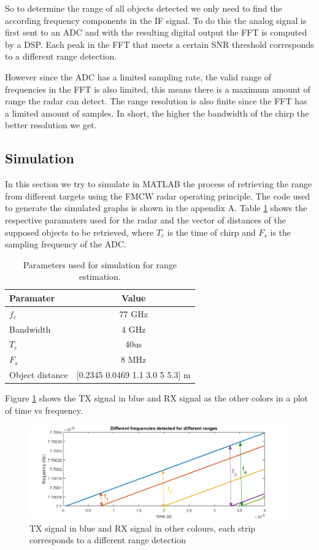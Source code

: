  So to determine the range of all objects detected we only need to find the according frequency components in the \ac{IF} signal. To do this the analog signal is first sent to an \ac{ADC} and with the resulting digital output the \ac{FFT} is computed by a \ac{DSP}. Each peak in the \ac{FFT} that meets a certain \ac{SNR} threshold corresponds to a different range detection. 
 
 However since the \ac{ADC} has a limited sampling rate, the valid range of frequencies in the \ac{FFT} is also limited, this means there is a maximum amount of range the radar can detect.
The range resolution is also finite since the \ac{FFT} has a limited amount of samples. In short, the higher the bandwidth of the chirp the better resolution we get.
\subsection*{Simulation}
In this section we try to simulate in MATLAB the process of retrieving the range from different targets using the \ac{FMCW} \ac{radar} operating principle. The code used to generate the simulated graphs is shown in the appendix A. Table \ref{tab:table1} shows the respective paramaters used for the radar and the vector of distances of the supposed objects to be retrieved, where $T_c$ is the time of chirp and $F_s$ is the sampling frequency of the \ac{ADC}.
\begin{table}[h!]
  \begin{center}
    \caption{Parameters used for simulation for range estimation.}
    \label{tab:table1}
    \begin{tabular}{l|c} %
      \textbf{Paramater} & \textbf{Value } \\
      \hline
      $f_c$ & 77 GHz \\
      Bandwidth & 4 GHz \\
      $T_c$ & 40us \\
      $F_s$ & 8 MHz \\
      Object distance & [0.2345 0.0469 1.1 3.0 5 5.3]  m
    \end{tabular}
  \end{center}
\end{table}
 Figure \ref{fig:if2} shows the TX signal in blue and RX signal as the other colors in a plot of time vs frequency.
 \begin{figure}[h] 
\centerline{\includegraphics [width=1.0 \textwidth]{imgs/chapter2/SimFrequencies.png}}
\caption[Demonstration of the TX signal in blue and RX signal in other colours]{TX signal in blue and RX signal in other colours, each strip corresponds to a different range detection}
\label{fig:if2}
\end{figure}

